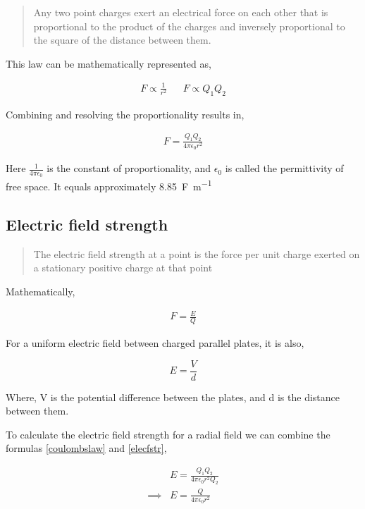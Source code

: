 \documentclass{scrbook}
\begin{document}
	\begin{quote}
		Any two point charges exert an electrical force on each other that is proportional to the product of the charges and inversely proportional to the square of the distance between them.
	\end{quote}

	This law can be mathematically represented as,

	\begin{align*}
		F \propto \frac{1}{r^2} &&
		F \propto Q_1 Q_2
	\end{align*}

	Combining and resolving the proportionality results in, 

	\begin{align} 
		F = \frac{Q_1 Q_2}{4\pi \epsilon_0 r^2 } \label{coulombslaw}
	\end{align}

	Here $\frac{1}{4\pi \epsilon_0}$ is the constant of proportionality, and $\epsilon_0$ is called the permittivity of free space. It equals approximately \SI{8.85}{\farad\per\meter}

\subsection{Electric field strength}

	\begin{quote}
		The electric field strength at a point is the force per unit charge exerted on a stationary positive charge at that point
	\end{quote}

	Mathematically, 

	\begin{align}
		F = \frac{E}{Q} \label{elecfstr}
	\end{align}

	For a uniform electric field between charged parallel plates, it is also,

	\[ E = \frac{V}{d} \]

	Where, V is the potential difference between the plates, and d is the distance between them.

	To calculate the electric field strength for a radial field we can combine the formulas \ref{coulombslaw} and \ref{elecfstr},

	\begin{align*}
		& E = \frac{Q_1 Q_2}{4\pi \epsilon_0 r^2 Q_2} \\
		\implies &  E = \frac{Q}{4\pi \epsilon_0 r^2}
	\end{align*}
\end{document}
